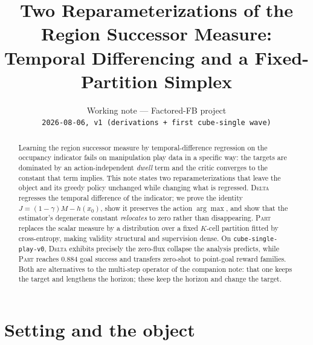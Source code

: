 \documentclass{article}
\title{Two Reparameterizations of the Region Successor Measure:\\
Temporal Differencing and a Fixed-Partition Simplex}
\author{Working note --- Factored-FB project\\
\texttt{2026-08-06, v1 (derivations + first cube-single wave)}}
\begin{document}
\maketitle

\begin{abstract}
Learning the region successor measure by temporal-difference regression on the
occupancy indicator fails on manipulation play data in a specific way: the
targets are dominated by an action-independent \emph{dwell} term and the critic
converges to the constant that term implies. This note states two
reparameterizations that leave the object and its greedy policy unchanged while
changing what is regressed. \textsc{Delta} regresses the temporal difference of
the indicator; we prove the identity $J=(1-\gamma)M-h(x_0)$, show it preserves
the action $\arg\max$, and show that the estimator's degenerate constant
\emph{relocates} to zero rather than disappearing. \textsc{Part} replaces the
scalar measure by a distribution over a fixed $K$-cell partition fitted by
cross-entropy, making validity structural and supervision dense. On
\texttt{cube-single-play-v0}, \textsc{Delta} exhibits precisely the zero-flux
collapse the analysis predicts, while \textsc{Part} reaches $0.884$ goal success
and transfers zero-shot to point-goal reward families. Both are alternatives to
the multi-step operator of the companion note: that one keeps the target and
lengthens the horizon; these keep the horizon and change the target.
\end{abstract}

\section{Setting and the object}
\end{document}
